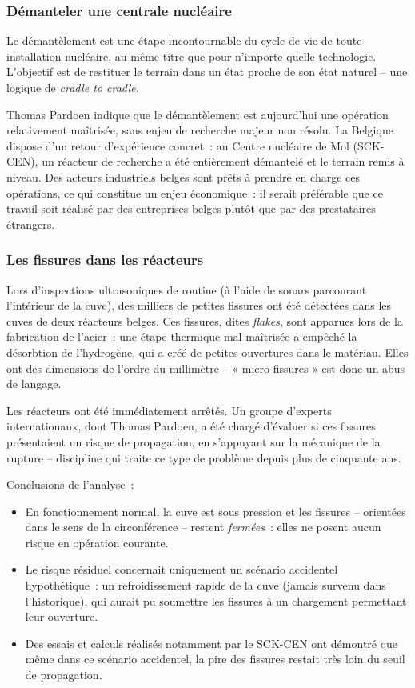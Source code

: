 \subsubsection{Démanteler une centrale nucléaire}

Le démantèlement est une étape incontournable du cycle de vie de toute installation nucléaire, au même titre que pour n'importe quelle technologie. L'objectif est de restituer le terrain dans un état proche de son état naturel -- une logique de \emph{cradle to cradle}.

Thomas Pardoen indique que le démantèlement est aujourd'hui une opération relativement maîtrisée, sans enjeu de recherche majeur non résolu. La Belgique dispose d'un retour d'expérience concret~: au Centre nucléaire de Mol (SCK-CEN), un réacteur de recherche a été entièrement démantelé et le terrain remis à niveau. Des acteurs industriels belges sont prêts à prendre en charge ces opérations, ce qui constitue un enjeu économique~: il serait préférable que ce travail soit réalisé par des entreprises belges plutôt que par des prestataires étrangers.

\subsubsection{Les fissures dans les réacteurs}

Lors d'inspections ultrasoniques de routine (à l'aide de sonars parcourant l'intérieur de la cuve), des milliers de petites fissures ont été détectées dans les cuves de deux réacteurs belges. Ces fissures, dites \emph{flakes}, sont apparues lors de la fabrication de l'acier~: une étape thermique mal maîtrisée a empêché la désorbtion de l'hydrogène, qui a créé de petites ouvertures dans le matériau. Elles ont des dimensions de l'ordre du millimètre -- « micro-fissures » est donc un abus de langage.

Les réacteurs ont été immédiatement arrêtés. Un groupe d'experts internationaux, dont Thomas Pardoen, a été chargé d'évaluer si ces fissures présentaient un risque de propagation, en s'appuyant sur la mécanique de la rupture -- discipline qui traite ce type de problème depuis plus de cinquante ans.

Conclusions de l'analyse~:
\begin{itemize}
    \item En fonctionnement normal, la cuve est sous pression et les fissures -- orientées dans le sens de la circonférence -- restent \emph{fermées}~: elles ne posent aucun risque en opération courante.
    \item Le risque résiduel concernait uniquement un scénario accidentel hypothétique~: un refroidissement rapide de la cuve (jamais survenu dans l'historique), qui aurait pu soumettre les fissures à un chargement permettant leur ouverture.
    \item Des essais et calculs réalisés notamment par le SCK-CEN ont démontré que même dans ce scénario accidentel, la pire des fissures restait très loin du seuil de propagation.
\end{itemize}

